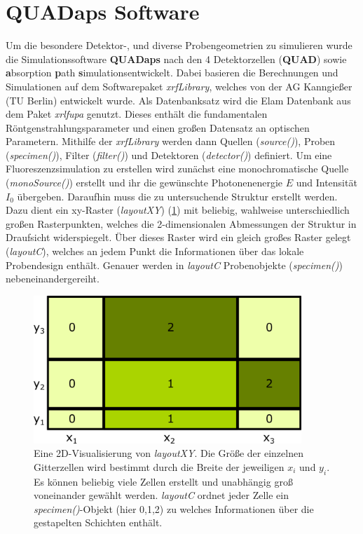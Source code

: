 \section{QUADaps Software}
Um die besondere Detektor-, und diverse Probengeometrien zu simulieren wurde die Simulationssoftware \textbf{QUADaps} nach den 4 Detektorzellen (\textbf{QUAD}) sowie \glqq\textbf{a}bsorption \textbf{p}ath \textbf{s}imulations\grqq entwickelt. Dabei basieren die Berechnungen und Simulationen auf dem Softwarepaket \textit{xrfLibrary}, welches von der AG Kanngießer (TU Berlin) entwickelt wurde. Als Datenbanksatz wird die Elam Datenbank aus dem Paket \textit{xrlfupa} genutzt. Dieses enthält die fundamentalen Röntgenstrahlungsparameter und einen großen Datensatz an optischen Parametern. Mithilfe der \textit{xrfLibrary} werden dann Quellen (\textit{source()}), Proben (\textit{specimen()}), Filter (\textit{filter()}) und Detektoren (\textit{detector()}) definiert. Um eine Fluoreszenzsimulation zu erstellen wird zunächst eine monochromatische Quelle (\textit{monoSource()}) erstellt und ihr die gewünschte Photonenenergie $E$ und Intensität $I_{0}$ übergeben. \newline
Daraufhin muss die zu untersuchende Struktur erstellt werden. Dazu dient ein xy-Raster (\textit{layoutXY}) (\cref{fig:xyc_layout}) mit beliebig, wahlweise unterschiedlich großen Rasterpunkten, welches die 2-dimensionalen Abmessungen der Struktur in Draufsicht widerspiegelt. Über dieses Raster wird ein gleich großes Raster gelegt (\textit{layoutC}), welches an jedem Punkt die Informationen über das lokale Probendesign enthält. Genauer werden in \textit{layoutC} Probenobjekte (\textit{specimen()}) nebeneinandergereiht. 

\begin{figure}[H]
  \centering
     \includegraphics[width=0.9\textwidth]{illustrations/xyc_layout.png}
  \caption[2D-Visualisierung von layoutXY]{Eine 2D-Visualisierung von \textit{layoutXY}. Die Größe der einzelnen Gitterzellen wird bestimmt durch die Breite der jeweiligen $x_i$ und $y_i$. Es können beliebig viele Zellen erstellt und unabhängig groß voneinander gewählt werden. \textit{layoutC} ordnet jeder Zelle ein \textit{specimen()}-Objekt (hier 0,1,2) zu welches Informationen über die gestapelten Schichten enthält.}
  \label{fig:xyc_layout}
\end{figure}



